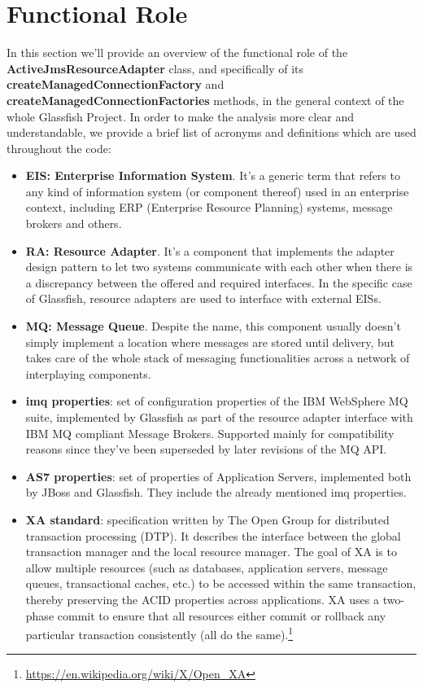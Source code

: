 \chapter{Functional Role}
In this section we'll provide an overview of the functional role of the \textbf{ActiveJmsResourceAdapter} class, and specifically of its \textbf{createManagedConnectionFactory} and \textbf{createManagedConnectionFactories} methods, in the general context of the whole Glassfish Project. 
In order to make the analysis more clear and understandable, we provide a brief list of acronyms and definitions which are used throughout the code:
\begin{itemize}
	\item \textbf{EIS: Enterprise Information System}. It's a generic term that refers to any kind of information system (or component thereof) used in an enterprise context, including ERP (Enterprise Resource Planning) systems, message brokers and others.
	\item \textbf{RA: Resource Adapter}. It's a component that implements the adapter design pattern to let two systems communicate with each other when there is a discrepancy between the offered and required interfaces. In the specific case of Glassfish, resource adapters are used to interface with external EISs.
	\item \textbf{MQ: Message Queue}. Despite the name, this component usually doesn't simply implement a location where messages are stored until delivery, but takes care of the whole stack of messaging functionalities across a network of interplaying components. 
	\item \textbf{imq properties}: set of configuration properties of the IBM WebSphere MQ suite, implemented by Glassfish as part of the resource adapter interface with IBM MQ compliant Message Brokers. Supported mainly for compatibility reasons since they've been superseded by later revisions of the MQ API. 
	\item \textbf{AS7 properties}: set of properties of Application Servers, implemented both by JBoss and Glassfish. They include the already mentioned imq properties. 
	\item \textbf{XA standard}: specification written by The Open Group for distributed transaction processing (DTP). It describes the interface between the global transaction manager and the local resource manager. The goal of XA is to allow multiple resources (such as databases, application servers, message queues, transactional caches, etc.) to be accessed within the same transaction, thereby preserving the ACID properties across applications. XA uses a two-phase commit to ensure that all resources either commit or rollback any particular transaction consistently (all do the same).\footnote{\url{https://en.wikipedia.org/wiki/X/Open_XA}} 

\end{itemize}
